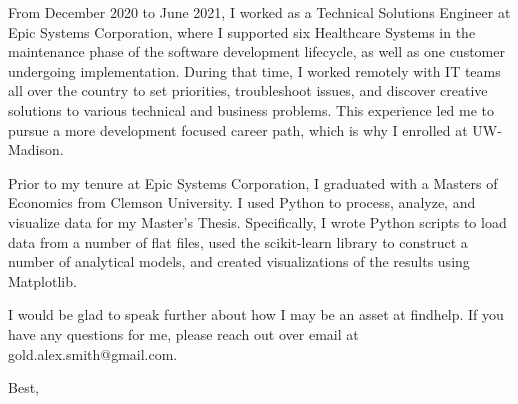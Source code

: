 \documentclass[a4paper, 10pt]{letter}
\begin{document}
\begin{letter}
			From December 2020 to June 2021, I worked as a Technical Solutions Engineer at Epic Systems Corporation, where I supported six Healthcare Systems in the maintenance phase of the software development lifecycle, as well as one customer undergoing implementation. During that time, I worked remotely with IT teams all over the country to set priorities, troubleshoot issues, and discover creative solutions to various technical and business problems. This experience led me to pursue a more development focused career path, which is why I enrolled at UW-Madison.

			Prior to my tenure at Epic Systems Corporation, I graduated with a Masters of Economics from Clemson University. I used Python to process, analyze, and visualize data for my Master’s Thesis. Specifically, I wrote Python scripts to load data from a number of flat files, used the scikit-learn library to construct a number of analytical models, and created visualizations of the results using Matplotlib.

			I would be glad to speak further about how I may be an asset at findhelp. If you have any questions for me, please reach out over email at gold.alex.smith@gmail.com. 
		    \closing{Best,}
		    \end{letter}
		    
\end{document}
